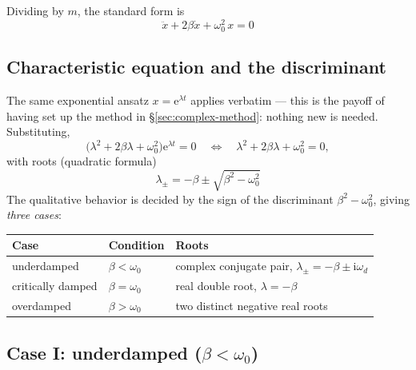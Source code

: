 \documentclass[11pt]{article}
\theoremstyle{plain}
\theoremstyle{definition}
\theoremstyle{remark}
\newcommand{\ee}{\mathrm{e}}
\newcommand{\ii}{\mathrm{i}}
\begin{document}
Dividing by $m$, the standard form is
\begin{equation}
  \boxed{\;\ddot x + 2\beta \dot x + \omega_0^2\, x = 0\;}
  \label{eq:damped}
\end{equation}

\subsection{Characteristic equation and the discriminant}

The same exponential ansatz $x = \ee^{\lambda t}$ applies verbatim ---
this is the payoff of having set up the method in
\S\ref{sec:complex-method}: nothing new is needed. Substituting,
\begin{equation}
  \bigl(\lambda^2 + 2\beta\lambda + \omega_0^2\bigr)\ee^{\lambda t} = 0
  \quad\Longleftrightarrow\quad
  \lambda^2 + 2\beta \lambda + \omega_0^2 = 0 ,
\end{equation}
with roots (quadratic formula)
\begin{equation}
  \boxed{\;
  \lambda_{\pm} = -\beta \pm \sqrt{\beta^2 - \omega_0^2}
  \;}
  \label{eq:damped-roots}
\end{equation}
The qualitative behavior is decided by the sign of the discriminant
$\beta^2-\omega_0^2$, giving \emph{three cases}:
\begin{center}
\begin{tabular}{lll}
\toprule
Case & Condition & Roots \\
\midrule
underdamped & $\beta < \omega_0$ & complex conjugate pair, $\lambda_\pm = -\beta \pm \ii\omega_d$ \\
critically damped & $\beta = \omega_0$ & real double root, $\lambda = -\beta$ \\
overdamped & $\beta > \omega_0$ & two distinct negative real roots \\
\bottomrule
\end{tabular}
\end{center}

\subsection{Case I: underdamped ($\beta < \omega_0$)}
\label{sec:underdamped}
\end{document}
